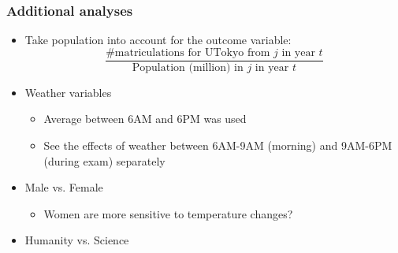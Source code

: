 \documentclass[10pt, pdfmx,hiresbb]{beamer}
\begin{document}
\begin{frame}
  \frametitle{Additional analyses}
  \begin{itemize}
    \item Take population into account for the outcome variable:
      \begin{equation*}
        \frac{\text{\# matriculations for UTokyo from $j$ in year $t$}}{\text{Population (million) in $j$ in year $t$}}
      \end{equation*}
    \item Weather variables
      \begin{itemize}
        \item Average between 6AM and 6PM was used
        \item See the effects of weather between 6AM-9AM (morning) and 9AM-6PM (during exam) separately
      \end{itemize}
    \item Male vs. Female
      \begin{itemize}
        \item Women are more sensitive to temperature changes?
      \end{itemize}
    \item Humanity vs. Science
  \end{itemize}
\end{frame}
\end{document}
